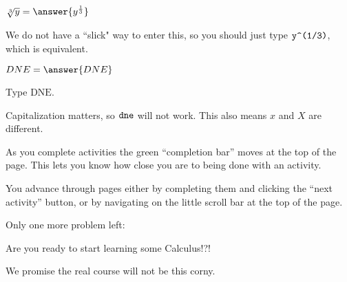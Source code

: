 \documentclass{ximera}
\begin{document}
	\begin{problem}
	$\sqrt[3]{y} = \answer{y^{\frac{1}{3}}}$
	\begin{hint}
		We do not have a ``slick" way to enter this, so you should just type $\verb!y^(1/3)!$, which is equivalent.
	\end{hint}
	\end{problem}


	\begin{problem}
		$DNE = \answer{DNE}$
		\begin{hint}
		Type $\textrm{DNE}$.
		\end{hint}
		\begin{feedback}
		Capitalization matters, so $\verb!dne!$ will not work.  This also means $x$ and $X$ are different. 
		\end{feedback}
	\end{problem}

        

As you complete activities the green ``completion bar'' moves at the
top of the page.  This lets you know how close you are to being done
with an activity.

You advance through pages either by completing them and clicking the
``next activity'' button, or by navigating on the little scroll bar at
the top of the page.
 
Only one more problem left:
\begin{problem}
    Are you ready to start learning some Calculus!?!
    \begin{multipleChoice}
    \end{multipleChoice}
      \begin{hint}
        We promise the real course will not be this corny.
      \end{hint}
\end{problem}
\end{document}
